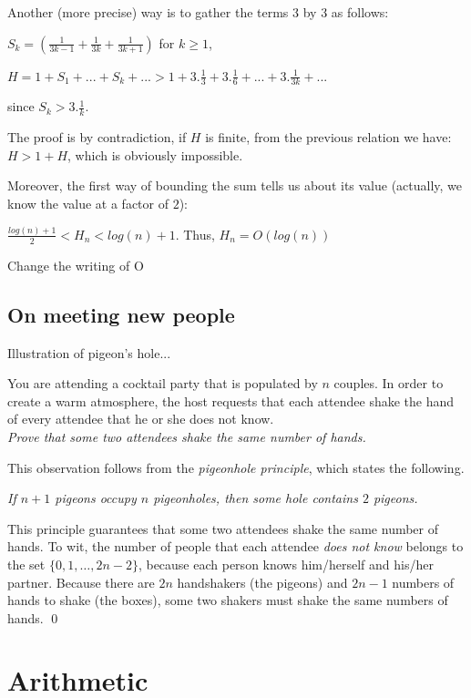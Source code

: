 Another (more precise) way is to gather the terms 3 by 3 as follows:

$S_k = (\frac{1}{3k-1} + \frac{1}{3k} + \frac{1}{3k+1} )$ for $k\geq1$, 

$H = 1 + S_1 + ... + S_k + ... > 1 + 3.\frac{1}{3} + 3.\frac{1}{6} + ... + 3.\frac{1}{3k} + ... $

since $S_k > 3.\frac{1}{k} $.

The proof is by contradiction, if $H$ is finite, from the previous relation we have: $H > 1 + H$, which is obviously impossible.
\bigskip

Moreover, the first way of  bounding the sum tells us about its value (actually, we know the value at a factor of $2$):

$\frac{log(n)+1}{2} < H_n < log(n)+1$. Thus, $H_n = O(log(n))$

{\Denis Change the writing of O}

\subsection{On meeting new people}

Illustration of pigeon's hole...
\medskip

You are attending a cocktail party that is populated by $n$ couples.
In order to create a warm atmosphere, the host requests that each
attendee shake the hand of every attendee that he or she does not
know.  \\
{\em Prove that some two attendees shake the same number of hands.}

\medskip

%
This observation follows from the {\it pigeonhole principle}, which
states the following.

{\it If $n+1$ pigeons occupy $n$ pigeonholes, then some hole contains
  $2$ pigeons.}

\noindent
This principle guarantees that some two attendees shake the same
number of hands.  To wit, the number of people that each attendee {\em
  does not know} belongs to the set $\{ 0, 1, \ldots, 2n-2 \}$,
because each person knows him/herself and his/her partner.  Because
there are $2n$ handshakers (the pigeons) and $2n-1$ numbers of hands
to shake (the boxes), some two shakers must shake the same numbers of
hands.  \qed



\section{Arithmetic}

